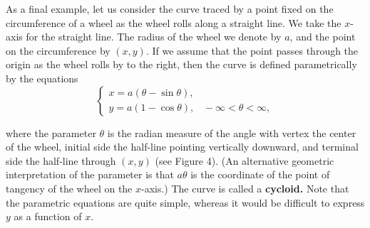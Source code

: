 As a final example, let us consider the curve traced by a point fixed on the circumference of a wheel as the wheel rolls along a straight line. We take the $x$-axis for the straight line. The radius of the wheel we denote by $a$, and the point on the circumference by $(x,y)$. If we assume that the point passes through the origin as the wheel rolls by to the right, then the curve is
defined parametrically by the equations
$$
\left \{ \begin{array}{l}
x = a(\theta - \sin \theta),\\
y = a(1 - \cos \theta), \;\;\; -\infty < \theta < \infty,
\end{array}
\right .
$$

\noindent where the parameter $\theta$ is the radian measure of the angle with vertex the center of the wheel, initial side the half-line pointing vertically downward, and terminal side the half-line through $(x, y)$ (see Figure 4). (An alternative
geometric interpretation of the parameter is that $a\theta$ is the coordinate of the point of tangency of the wheel on the $x$-axis.) The curve is called a \textbf{cycloid.} Note that the parametric equations are quite simple, whereas it would be difficult to express $y$ as a function of $x$.



